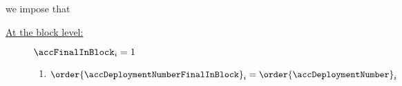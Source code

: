 \begin{description}
		we impose that
		\begin{description}
			\item[\underline{At the block level:}]
				\If $\accFinalInBlock _{i} = 1$ \Then
				\begin{enumerate}
					\item $\order{\accDeploymentNumberFinalInBlock} _{i} = \order{\accDeploymentNumber} _{i}$
				\end{enumerate}
		\end{description}
\end{description}
